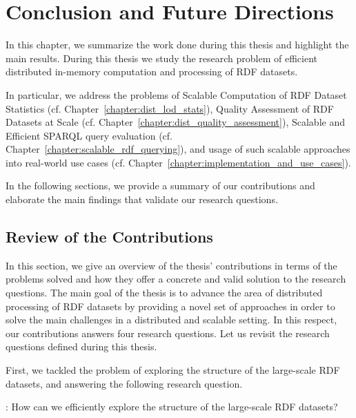 \chapter{Conclusion and Future Directions}
\label{chapter:conclusion}

In this chapter, we summarize the work done during this thesis and highlight the main results.
During this thesis we study the research problem of efficient distributed in-memory computation and processing of \gls{RDF} datasets.

In particular, we address the problems of Scalable Computation of \gls{RDF} Dataset Statistics (cf. Chapter~\ref{chapter:dist_lod_stats}), Quality Assessment of \gls{RDF} Datasets at Scale (cf. Chapter~\ref{chapter:dist_quality_assessment}), Scalable and Efficient \gls{SPARQL} query evaluation (cf. Chapter~\ref{chapter:scalable_rdf_querying}), and usage of such scalable approaches into real-world use cases (cf. Chapter~\ref{chapter:implementation_and_use_cases}).

In the following sections, we provide a summary of our contributions and elaborate the main findings that validate our research questions.

\section{Review of the Contributions}
In this section, we give an overview of the thesis' contributions in terms of the problems solved and how they offer a concrete and valid solution to the research questions.
The main goal of the thesis is to advance the area of distributed processing of \gls{RDF} datasets by providing a novel set of approaches in order to solve the main challenges in a distributed and scalable setting.
In this respect, our contributions answers four research questions.
Let us revisit the research questions defined during this thesis.

First, we tackled the problem of exploring the structure of the large-scale \gls{RDF} datasets, and answering the following research question.

\begin{tcolorbox}
\textbf{\rqNr[RQ1]\label{rqc:1}}: How can we efficiently explore the structure of the large-scale \gls{RDF} datasets?
\end{tcolorbox}

